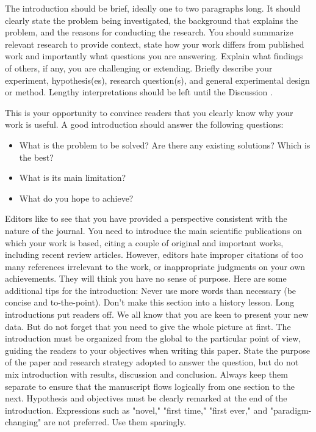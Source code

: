 \documentclass[a4paper, 10pt, conference]{ieeeconf}      %
\begin{document}
The introduction should be brief, ideally one to two paragraphs long. It should clearly state the problem being investigated, the background that explains the problem, and the reasons for conducting the research. You should summarize relevant research to provide context, state how your work differs from published work and importantly what questions you are answering. Explain what findings of others, if any, you are challenging or extending. Briefly describe your experiment, hypothesis(es), research question(s), and general experimental design or method. Lengthy interpretations should be left until the Discussion \cite{atwoodetal2015}.

This is your opportunity to convince readers that you clearly know why your work is useful. A good introduction should answer the following questions:
\begin{itemize}
\item What is the problem to be solved? Are there any existing solutions? Which is the best?
\item What is its main limitation? 
\item What do you hope to achieve?
\end{itemize}
Editors like to see that you have provided a perspective consistent with the nature of the journal. You need to introduce the main scientific publications on which your work is based, citing a couple of original and important works, including recent review articles.
However, editors hate improper citations of too many references irrelevant to the work, or inappropriate judgments on your own achievements. They will think you have no sense of purpose.
Here are some additional tips for the introduction:
Never use more words than necessary (be concise and to-the-point). Don't make this section into a history lesson. Long introductions put readers off.
We all know that you are keen to present your new data. But do not forget that you need to give the whole picture at first.
The introduction must be organized from the global to the particular point of view, guiding the readers to your objectives when writing this paper.
State the purpose of the paper and research strategy adopted to answer the question, but do not mix introduction with results, discussion and conclusion. Always keep them separate to ensure that the manuscript flows logically from one section to the next.
Hypothesis and objectives must be clearly remarked at the end of the introduction. Expressions such as "novel," "first time," "first ever," and "paradigm-changing" are not preferred. Use them sparingly.
\end{document}
